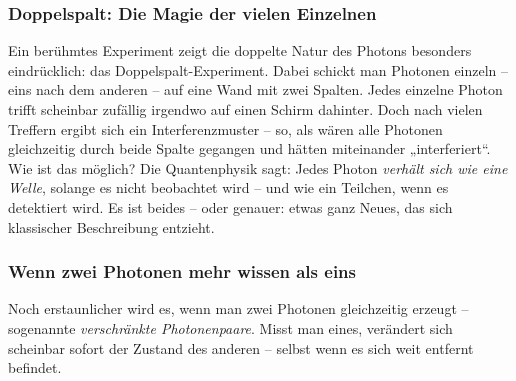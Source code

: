 \subsubsection{Doppelspalt: Die Magie der vielen Einzelnen}
Ein berühmtes Experiment zeigt die doppelte Natur des Photons besonders eindrücklich: das Doppelspalt-Experiment. Dabei schickt man Photonen einzeln – eins nach dem anderen – auf eine Wand mit zwei Spalten.
Jedes einzelne Photon trifft scheinbar zufällig irgendwo auf einen Schirm dahinter. Doch nach vielen Treffern ergibt sich ein Interferenzmuster – so, als wären alle Photonen gleichzeitig durch beide Spalte gegangen und hätten miteinander „interferiert“.
Wie ist das möglich? Die Quantenphysik sagt: Jedes Photon \emph{verhält sich wie eine Welle}, solange es nicht beobachtet wird – und wie ein Teilchen, wenn es detektiert wird. Es ist beides – oder genauer: etwas ganz Neues, das sich klassischer Beschreibung entzieht.

\subsubsection{Wenn zwei Photonen mehr wissen als eins}
Noch erstaunlicher wird es, wenn man zwei Photonen gleichzeitig erzeugt – sogenannte \textit{verschränkte Photonenpaare}. Misst man eines, verändert sich scheinbar sofort der Zustand des anderen – selbst wenn es sich weit entfernt befindet.


